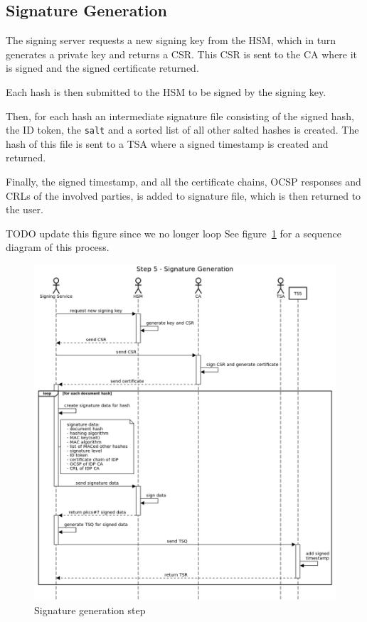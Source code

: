 \subsection{Signature Generation}\label{subsec:signature-generation}
The signing server requests a new signing key from the \gls{HSM}, which in turn generates a private key and returns a \gls{CSR}.
This \gls{CSR} is sent to the \gls{CA} where it is signed and the signed certificate returned.

Each hash is then submitted to the \gls{HSM} to be signed by the signing key.

Then, for each hash an intermediate signature file consisting of the signed hash,
the ID token, the \texttt{salt} and a sorted list of all other salted hashes is created.
The hash of this file is sent to a \gls{TSA} where a signed timestamp is created and returned.

Finally, the signed timestamp, and all the certificate chains,
\gls{OCSP} responses and \gls{CRL}s of the involved parties,
is added to signature file, which is then returned to the user.

TODO update this figure since we no longer loop
See figure~\ref{fig:signaturegenerationstep} for a sequence diagram of this process.

\begin{figure}
    \begin{center}
        \includegraphics[scale=0.45]{images/protocol_step5_signature_generation.png}
        \caption{Signature generation step}
        \label{fig:signaturegenerationstep}
    \end{center}
\end{figure}

